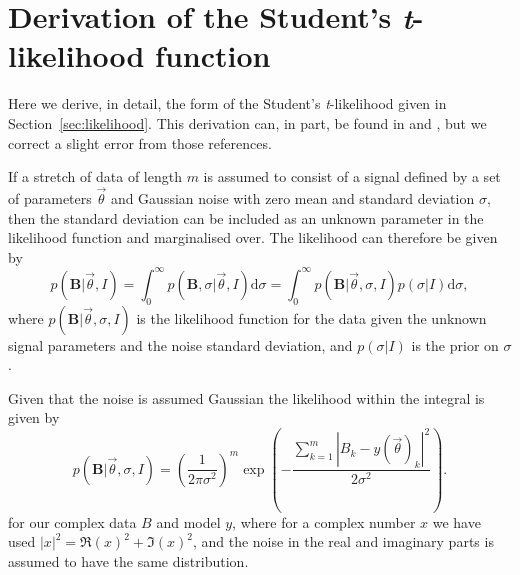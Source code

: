 \section{Derivation of the Student's {\it t}-likelihood function}\label{app:likelihood}

Here we derive, in detail, the form of the Student's {\it t}-likelihood given in Section~\ref{sec:likelihood}.
This derivation can, in part, be found in \citet{Dupuisthesis} and \citet{2005PhRvD..72j2002D}, but we correct a
slight error from those references.

If a stretch of data of length $m$ is assumed to consist of a signal
defined by a set of parameters $\vec{\theta}$ and Gaussian noise with zero mean and standard deviation
$\sigma$, then the standard deviation can be included as an unknown parameter in the likelihood function and
marginalised over. The likelihood can therefore be given by
\begin{equation}\label{eq:likesigma}
p(\mathbf{B}|\vec{\theta},I) = \int_0^{\infty} p(\mathbf{B},\sigma|\vec{\theta},I) \text{d}\sigma =
\int_0^{\infty} p(\mathbf{B}|\vec{\theta},\sigma,I)p(\sigma|I) \text{d}\sigma,
\end{equation}
where $p(\mathbf{B}|\vec{\theta},\sigma,I)$ is the likelihood function for the data given the unknown signal
parameters and the noise standard deviation, and $p(\sigma|I)$ is the prior on $\sigma$.

Given that the noise is assumed Gaussian the likelihood within the integral is given by
\begin{equation}\label{eq:likesigma2}
p(\mathbf{B}|\vec{\theta},\sigma,I) = \left(\frac{1}{2\pi\sigma^2}\right)^{m}
\exp{\left( -\frac{\sum_{k=1}^m|B_k-y(\vec{\theta})_k|^2}{2\sigma^2} \right)}.
\end{equation}
for our complex data $B$ and model $y$, where for a complex number $x$ we have used $|x|^2 =
\Re{(x)}^2+\Im{(x)}^2$, and the noise in the real and imaginary parts is assumed to have the same
distribution.

